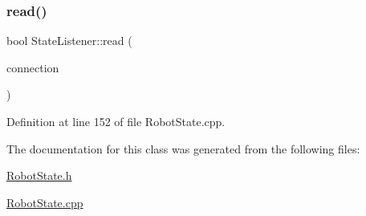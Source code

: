 \subsubsection{\texorpdfstring{read()}{read()}}
{\footnotesize\ttfamily bool State\+Listener\+::read (\begin{DoxyParamCaption}\item[{yarp\+::os\+::\+Connection\+Reader \&}]{connection }\end{DoxyParamCaption})}



Definition at line 152 of file Robot\+State.\+cpp.



The documentation for this class was generated from the following files\+:\begin{DoxyCompactItemize}
\item 
\hyperlink{RobotState_8h}{Robot\+State.\+h}\item 
\hyperlink{RobotState_8cpp}{Robot\+State.\+cpp}\end{DoxyCompactItemize}
